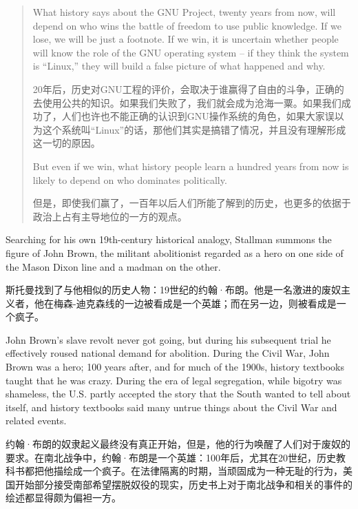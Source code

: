 \begin{quote}
\ifdefined\eng
What history says about the GNU Project, twenty years from now, will depend on who wins the battle of freedom to use public knowledge. If we lose, we will be just a footnote. If we win, it is uncertain whether people will know the role of the GNU operating system -- if they think the system is ``Linux,'' they will build a false picture of what happened and why.
\fi

\ifdefined\chs
20年后，历史对GNU工程的评价，会取决于谁赢得了自由的斗争，正确的去使用公共的知识。如果我们失败了，我们就会成为沧海一粟。如果我们成功了，人们也许也不能正确的认识到GNU操作系统的角色，如果大家误以为这个系统叫“Linux”的话，那他们其实是搞错了情况，并且没有理解形成这一切的原因。
\fi

\ifdefined\eng
But even if we win, what history people learn a hundred years from now is likely to depend on who dominates politically.
\fi

\ifdefined\chs
但是，即使我们赢了，一百年以后人们所能了解到的历史，也更多的依据于政治上占有主导地位的一方的观点。
\fi
\end{quote}

\ifdefined\eng
Searching for his own 19th-century historical analogy, Stallman summons the figure of John Brown, the militant abolitionist regarded as a hero on one side of the Mason Dixon line and a madman on the other.
\fi

\ifdefined\chs
斯托曼找到了与他相似的历史人物：19世纪的约翰·布朗。他是一名激进的废奴主义者，他在梅森-迪克森线的一边被看成是一个英雄；而在另一边，则被看成是一个疯子。
\fi

\ifdefined\eng
John Brown's slave revolt never got going, but during his subsequent trial he effectively roused national demand for abolition. During the Civil War, John Brown was a hero; 100 years after, and for much of the 1900s, history textbooks taught that he was crazy. During the era of legal segregation, while bigotry was shameless, the U.S. partly accepted the story that the South wanted to tell about itself, and history textbooks said many untrue things about the Civil War and related events.
\fi

\ifdefined\chs
约翰·布朗的奴隶起义最终没有真正开始，但是，他的行为唤醒了人们对于废奴的要求。在南北战争中，约翰·布朗是一个英雄：100年后，尤其在20世纪，历史教科书都把他描绘成一个疯子。在法律隔离的时期，当顽固成为一种无耻的行为，美国开始部分接受南部希望摆脱奴役的现实，历史书上对于南北战争和相关的事件的绘述都显得颇为偏袒一方。
\fi


